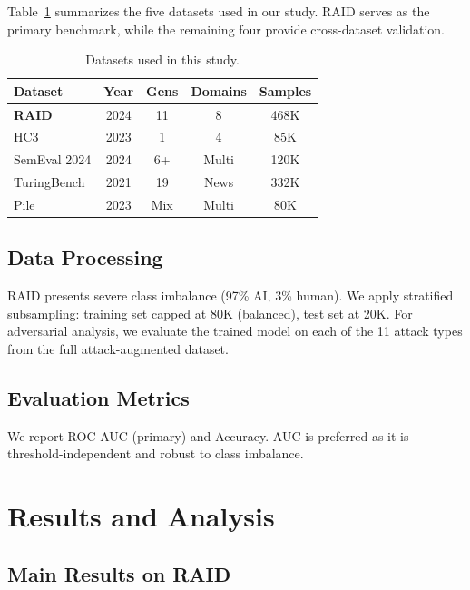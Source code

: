 \documentclass[sigconf,nonacm]{acmart}
\begin{document}
Table~\ref{tab:datasets} summarizes the five datasets used in our study. RAID serves as the primary benchmark, while the remaining four provide cross-dataset validation.

\begin{table}[t]
\caption{Datasets used in this study.}
\label{tab:datasets}
\small
\begin{tabular}{lcccc}
\toprule
\textbf{Dataset} & \textbf{Year} & \textbf{Gens} & \textbf{Domains} & \textbf{Samples} \\
\midrule
\textbf{RAID}    & 2024 & 11 & 8     & 468K \\
HC3              & 2023 & 1  & 4     & 85K  \\
SemEval 2024     & 2024 & 6+ & Multi & 120K \\
TuringBench      & 2021 & 19 & News  & 332K \\
Pile             & 2023 & Mix & Multi & 80K  \\
\bottomrule
\end{tabular}
\end{table}

\subsection{Data Processing}

RAID presents severe class imbalance (97\% AI, 3\% human). We apply stratified subsampling: training set capped at 80K (balanced), test set at 20K. For adversarial analysis, we evaluate the trained model on each of the 11 attack types from the full attack-augmented dataset.

\subsection{Evaluation Metrics}

We report ROC AUC (primary) and Accuracy. AUC is preferred as it is threshold-independent and robust to class imbalance.

\section{Results and Analysis}

\subsection{Main Results on RAID}
\end{document}
